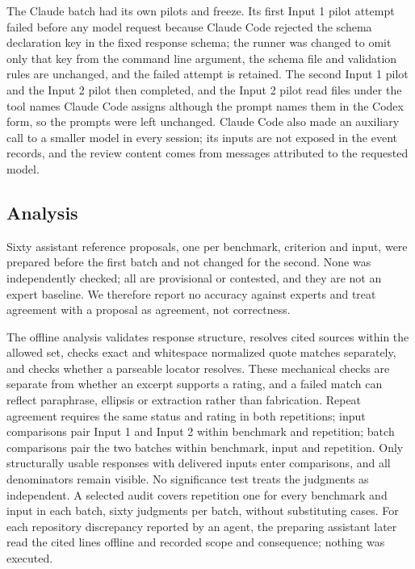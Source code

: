 \documentclass[10pt,conference]{IEEEtran}
\begin{document}
The Claude batch had its own pilots and freeze. Its first Input 1 pilot attempt failed before any model request because Claude Code rejected the schema declaration key in the fixed response schema; the runner was changed to omit only that key from the command line argument, the schema file and validation rules are unchanged, and the failed attempt is retained. The second Input 1 pilot and the Input 2 pilot then completed, and the Input 2 pilot read files under the tool names Claude Code assigns although the prompt names them in the Codex form, so the prompts were left unchanged. Claude Code also made an auxiliary call to a smaller model in every session; its inputs are not exposed in the event records, and the review content comes from messages attributed to the requested model.

\subsection{Analysis}
Sixty assistant reference proposals, one per benchmark, criterion and input, were prepared before the first batch and not changed for the second. None was independently checked; all are provisional or contested, and they are not an expert baseline. We therefore report no accuracy against experts and treat agreement with a proposal as agreement, not correctness.

The offline analysis validates response structure, resolves cited sources within the allowed set, checks exact and whitespace normalized quote matches separately, and checks whether a parseable locator resolves. These mechanical checks are separate from whether an excerpt supports a rating, and a failed match can reflect paraphrase, ellipsis or extraction rather than fabrication. Repeat agreement requires the same status and rating in both repetitions; input comparisons pair Input 1 and Input 2 within benchmark and repetition; batch comparisons pair the two batches within benchmark, input and repetition. Only structurally usable responses with delivered inputs enter comparisons, and all denominators remain visible. No significance test treats the judgments as independent. A selected audit covers repetition one for every benchmark and input in each batch, sixty judgments per batch, without substituting cases. For each repository discrepancy reported by an agent, the preparing assistant later read the cited lines offline and recorded scope and consequence; nothing was executed.
\end{document}

